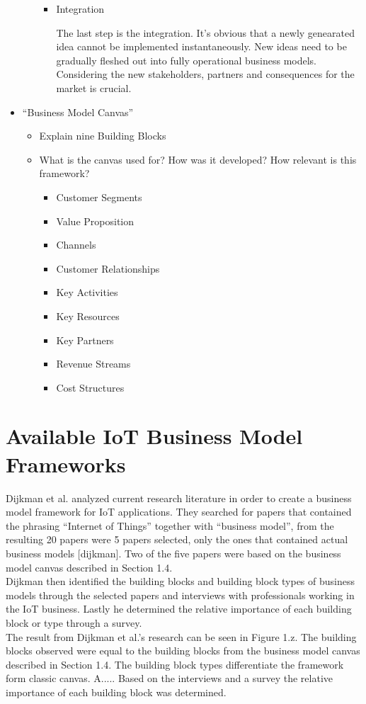 \begin{itemize}
\begin{itemize}
\begin{itemize}
					\item Integration

					The last step is the integration. It's obvious that a newly genearated idea cannot be implemented instantaneously. New ideas need to be gradually fleshed out into fully operational business models. Considering the new stakeholders, partners and consequences for the market is crucial.


				\end{itemize}
			\end{itemize}
		\item ``Business Model Canvas'' \cite{bmc}
			\begin{itemize}
				\item Explain nine Building Blocks
				\item What is the canvas used for? How was it developed? How relevant is this framework?
				\begin{itemize}
					\item Customer Segments
					\item Value Proposition
					\item Channels
					\item Customer Relationships
					\item Key Activities
					\item Key Resources
					\item Key Partners
					\item Revenue Streams
					\item Cost Structures
				\end{itemize}
			\end{itemize}
	\end{itemize}
\section{Available IoT Business Model Frameworks}

Dijkman et al. analyzed current research literature in order to create a business model framework for IoT applications. They searched for papers that contained the phrasing ``Internet of Things'' together with ``business model'', from the resulting 20 papers were 5 papers selected, only the ones that contained actual business models [dijkman]. Two of the five papers were based on the business model canvas described in Section 1.4. \\
Dijkman then identified the building blocks and building block types of business models through the selected papers and interviews with professionals working in the IoT business. Lastly he determined the relative importance of each building block or type through a survey.\\
The result from Dijkman et al.'s research can be seen in Figure 1.z. The building blocks observed were equal to the building blocks from the business model canvas described in Section 1.4. The building block types differentiate the framework form classic canvas. A.....\tabularnewline
Based on the interviews and a survey the relative importance of each building block was determined. 

